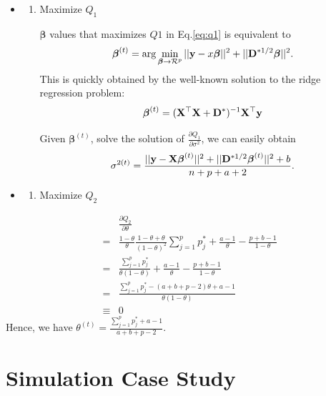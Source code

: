 \documentclass[]{book}
\providecommand{\tightlist}{%
  \setlength{\itemsep}{0pt}\setlength{\parskip}{0pt}}
\begin{document}
\begin{itemize}
\item
  \begin{enumerate}
  \def\labelenumi{(\arabic{enumi})}
  \item
    Maximize \(Q_1\)

    \({\boldsymbol \beta}\) values that maximizes \(Q1\) in Eq.\eqref{eq:q1} is equivalent to
    \[
      {\boldsymbol \beta}^{(t)}=\arg\min_{{\boldsymbol \beta}\to\mathcal{R}^p}||{\bf y}-x{\boldsymbol \beta}||^2+||{\bf D}^{*1/2}{\boldsymbol \beta}||^2.
      \]
    This is quickly obtained by the well-known solution to the ridge regression problem:
    \[
      {\boldsymbol \beta}^{(t)} = ({\bf X}^{{\top}}{\bf X}+{\bf D}^*)^{-1}{\bf X}^{{\top}}{\bf y}
      \]

    Given \({\boldsymbol \beta}^{(t)}\), solve the solution of \(\frac{\partial Q_1}{\partial \sigma^2}\), we can easily obtain
    \[
      \sigma^{2(t)} = \frac{||{\bf y}-{\bf X}{\boldsymbol \beta}^{(t)}||^2+ ||{\bf D}^{*1/2}{\boldsymbol \beta}^{(t)}||^2 + b}{n+p+a+2}.
      \]
  \end{enumerate}
\item
  \begin{enumerate}
  \def\labelenumi{(\arabic{enumi})}
  \setcounter{enumi}{1}
  \tightlist
  \item
    Maximize \(Q_2\)
  \end{enumerate}
\end{itemize}

\begin{eqnarray*}
            &&\frac{\partial Q_2}{\partial \theta}\\
            &=& \frac{1-\theta}{\theta}\frac{1-\theta+\theta}{(1-\theta)^2}\sum_{j=1}^{p}p_j^*+\frac{a-1}{\theta}-\frac{p+b-1}{1-\theta}\\
            &=&\frac{\sum_{j=1}^{p}p_j^*}{\theta(1-\theta)}+\frac{a-1}{\theta}-\frac{p+b-1}{1-\theta}\\
            &=&\frac{\sum_{j=1}^{p}p_j^*-(a+b+p-2)\theta+a-1}{\theta(1-\theta)}\\
            &\equiv& 0
\end{eqnarray*}
Hence, we have \(\theta^{(t)}=\frac{\sum_{j=1}^{p}p_j^*+a-1}{a+b+p-2}\).

\hypertarget{simulation-case-study}{%
\section{Simulation Case Study}\label{simulation-case-study}}
\end{document}

